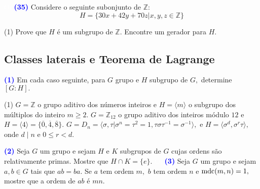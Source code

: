 \documentclass[12pt, a4paper]{article}
\newcommand{\mdc}{{\rm mdc}}
\newcommand{\negrito}[1]{\mbox{\boldmath{$#1$}}}
\begin{document}
\textcolor{white}{Oi}\newline\newline
\textcolor{blue}{\bf(35)}\label{ex11} Considere o seguinte subonjunto de $\mathbb{Z}:$
\[
H = \{ 30x + 42y + 70z | x,y,z \in \mathbb{Z} \}
\]
\begin{tasks}[counter-format={(tsk[a])},label-width=3.6ex, label-format = {\bfseries}, column-sep = {0pt}](1)
\task[\textcolor{Floresta}{$\negrito{(a)} $}] Prove que $H$ é um subgrupo de $\mathbb{Z}.$
\task[\textcolor{Floresta}{$\negrito{(b)} $}] Encontre um gerador para $H.$
\end{tasks}
\newpage
\subsection{\textcolor{Floresta}{Classes laterais e Teorema de Lagrange}}
\textcolor{blue}{\bf(1)}\label{33} Em cada caso seguinte, para $G$ grupo e $H$ subgrupo de $G,$ determine $[G : H].$
\begin{tasks}[counter-format={(tsk[a])},label-width=3.6ex, label-format = {\bfseries}, column-sep = {0pt}](1)
\task[\textcolor{Floresta}{$\negrito{(a)} $}] $G = \mathbb{Z}$ o grupo aditivo dos números inteiros e $H = \langle m \rangle$ o subgrupo dos múltiplos do inteiro $m \ge 2.$ %
\task[\textcolor{Floresta}{$\negrito{(b)} $}] $G = \mathbb{Z}_{12}$ o grupo aditivo dos inteiros módulo $12$ e $H = \langle 4 \rangle = \{\overline{0},\overline{4},\overline{8}\}.$%
\task[\textcolor{Floresta}{$\negrito{(c)} $}] $G = D_n = \langle \sigma, \tau | \sigma^n = \tau^2 = 1, \tau \sigma \tau^{-1} = \sigma^{-1} \rangle,$ e $H = \langle \sigma^d, \sigma^r \tau \rangle,$ onde $d \mid n$ e $0 \le r < d.$%
\end{tasks}
\textcolor{blue}{\bf(2)}\label{34} Seja $G$ um grupo e sejam $H$ e $K$ subgrupos de $G$ cujas ordens são relativamente primas. Mostre que $H \cap K = \{ e \}.$
\textcolor{white}{Oi}\newline\newline
\textcolor{blue}{\bf(3)}\label{35} Seja $G$ um grupo e sejam $a,b \in G$ tais que $ab=ba.$ Se $a$ tem ordem $m,$ $b$ tem ordem $n$ e $\mdc(m,n) = 1,$ mostre que a ordem de $ab$ é $mn.$
\end{document}
